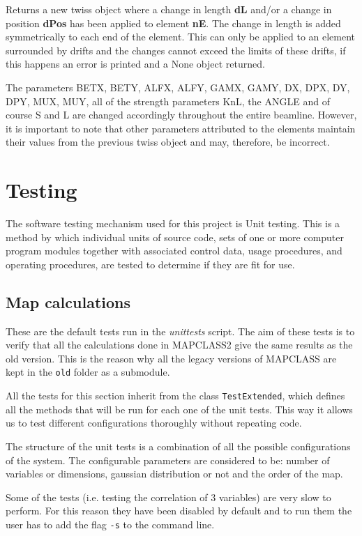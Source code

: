\documentclass[a4paper]{cernatsnote}
\begin{document}
Returns a new twiss object where a change in length \textbf{dL} and/or
a change in position \textbf{dPos} has been applied to element
\textbf{nE}. The change in length is added symmetrically to each end
of the element. This can only be applied to an element surrounded by
drifts and the changes cannot exceed the limits of these drifts, if
this happens an error is printed and a None object returned.

The parameters BETX, BETY, ALFX, ALFY, GAMX, GAMY, DX, DPX, DY, DPY,
MUX, MUY, all of the strength parameters KnL, the ANGLE and of course
S and L are changed accordingly throughout the entire beamline.
However, it is important to note that other parameters attributed to
the elements maintain their values from the previous twiss object and
may, therefore, be incorrect.

\section{Testing}
\label{sec:test}
The software testing mechanism used for this project is Unit testing.
This is a method by which individual units of source code, sets of one
or more computer program modules together with associated control
data, usage procedures, and operating procedures, are tested to
determine if they are fit for use.

\subsection{Map calculations}
These are the default tests run in the \textit{unittests} script. The
aim of these tests is to verify that all the calculations done in
\textsc{MAPCLASS2} give the same results as the old version. This is
the reason why all the legacy versions of \textsc{MAPCLASS} are kept
in the \texttt{old} folder as a submodule.

All the tests for this section inherit from the class
\texttt{TestExtended}, which defines all the methods that will be run
for each one of the unit tests. This way it allows us to test
different configurations thoroughly without repeating code.

The structure of the unit tests is a combination of all the possible
configurations of the system. The configurable parameters are
considered to be: number of variables or dimensions, gaussian
distribution or not and the order of the map.

Some of the tests (i.e. testing the correlation of 3 variables) are
very slow to perform. For this reason they have been disabled by
default and to run them the user has to add the flag \texttt{-s} to
the command line.
\end{document}
